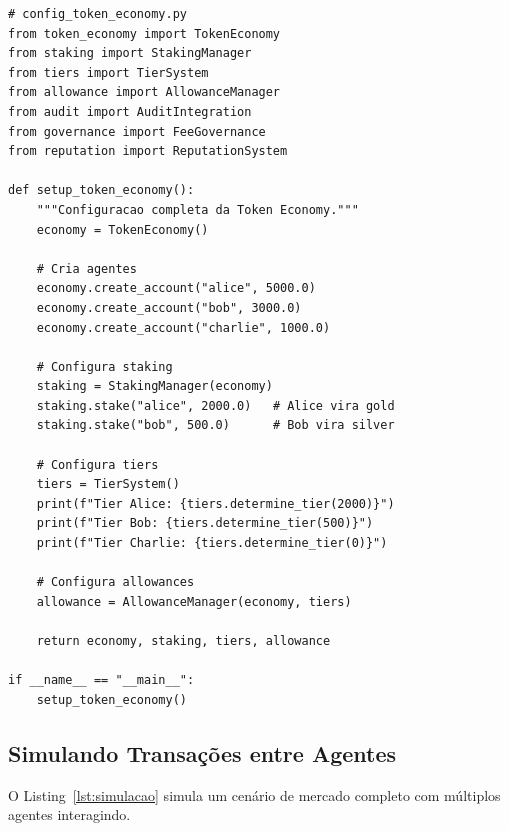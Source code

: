 \begin{lstlisting}[caption={Configuracao completa da Token Economy},
                  label={lst:configuracao}]
# config_token_economy.py
from token_economy import TokenEconomy
from staking import StakingManager
from tiers import TierSystem
from allowance import AllowanceManager
from audit import AuditIntegration
from governance import FeeGovernance
from reputation import ReputationSystem

def setup_token_economy():
    """Configuracao completa da Token Economy."""
    economy = TokenEconomy()

    # Cria agentes
    economy.create_account("alice", 5000.0)
    economy.create_account("bob", 3000.0)
    economy.create_account("charlie", 1000.0)

    # Configura staking
    staking = StakingManager(economy)
    staking.stake("alice", 2000.0)   # Alice vira gold
    staking.stake("bob", 500.0)      # Bob vira silver

    # Configura tiers
    tiers = TierSystem()
    print(f"Tier Alice: {tiers.determine_tier(2000)}")
    print(f"Tier Bob: {tiers.determine_tier(500)}")
    print(f"Tier Charlie: {tiers.determine_tier(0)}")

    # Configura allowances
    allowance = AllowanceManager(economy, tiers)

    return economy, staking, tiers, allowance

if __name__ == "__main__":
    setup_token_economy()
\end{lstlisting}

\subsection{Simulando Transações entre Agentes}

O Listing~\ref{lst:simulacao} simula um cenário de mercado
completo com múltiplos agentes interagindo.

